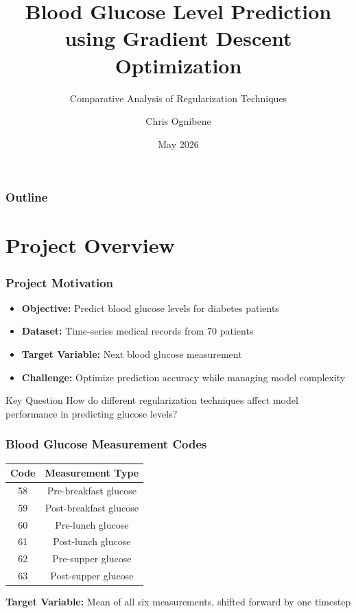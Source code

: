 \documentclass[11pt,aspectratio=169]{beamer}
\title{Blood Glucose Level Prediction\\using Gradient Descent Optimization}
\subtitle{Comparative Analysis of Regularization Techniques}
\author{Chris Ognibene}
\date{May 2026}
\institute{CPE 608: Optimization Algorithms}
\begin{document}
\frame{\titlepage}

\begin{frame}
    \frametitle{Outline}
    \tableofcontents
\end{frame}

\section{Project Overview}

\begin{frame}
    \frametitle{Project Motivation}
    \begin{itemize}
        \item \textbf{Objective:} Predict blood glucose levels for diabetes patients
        \item \textbf{Dataset:} Time-series medical records from 70 patients
        \item \textbf{Target Variable:} Next blood glucose measurement
        \item \textbf{Challenge:} Optimize prediction accuracy while managing model complexity
    \end{itemize}
    \vspace{1cm}
    \begin{block}{Key Question}
        How do different regularization techniques affect model performance in predicting glucose levels?
    \end{block}
\end{frame}

\begin{frame}
    \frametitle{Blood Glucose Measurement Codes}
    \begin{table}
        \centering
        \begin{tabular}{cc}
            \toprule
            \textbf{Code} & \textbf{Measurement Type} \\
            \midrule
            58 & Pre-breakfast glucose \\
            59 & Post-breakfast glucose \\
            60 & Pre-lunch glucose \\
            61 & Post-lunch glucose \\
            62 & Pre-supper glucose \\
            63 & Post-supper glucose \\
            \bottomrule
        \end{tabular}
    \end{table}
    \vspace{0.5cm}
    \textbf{Target Variable:} Mean of all six measurements, shifted forward by one timestep
\end{frame}
\end{document}
